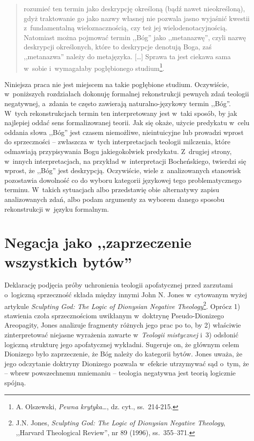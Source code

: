 \begin{quote}
rozumieć ten termin jako deskrypcję określoną (bądź nawet nieokreśloną), gdyż traktowanie go jako nazwy własnej nie pozwala jasno wyjaśnić kwestii z~fundamentalną wieloznacznością, czy też jej wielodenotacyjnością. Natomiast można pojmować termin ,,Bóg'' jako ,,metanazwę'', czyli nazwę deskrypcji określonych, które to deskrypcje denotują Boga, zaś ,,metanazwa'' należy do metajęzyka. [\ldots] Sprawa ta jest ciekawa sama w~sobie i~wymagałaby pogłębionego studium\footnote{A. Olszewski, \textit{Pewna krytyka}\ldots, dz. cyt., ss.~214-215.}.
\end{quote}

Niniejsza praca nie jest miejscem na takie pogłębione studium. Oczywiście, w~poniższych rozdziałach dokonuję formalnej rekonstrukcji pewnych zdań teologii negatywnej, a~zdania te często zawierają naturalno-językowy termin ,,Bóg''. W~tych rekonstrukcjach termin ten interpretowany jest w~taki sposób, by jak najlepiej oddać sens formalizowanej teorii. Jak się okaże, użycie predykatu w~celu oddania słowa ,,Bóg'' jest czasem niemożliwe, nieintuicyjne lub prowadzi wprost do sprzeczności – zwłaszcza w~tych interpretacjach teologii milczenia, które odmawiają przypisywania Bogu jakiegokolwiek predykatu. Z~drugiej strony, w~innych interpretacjach, na przykład w~interpretacji Bocheńskiego, twierdzi się wprost, że ,,Bóg'' jest deskrypcją. Oczywiście, wiele z~analizowanych stanowisk pozostawia dowolność co do wyboru kategorii językowej tego problematycznego terminu. W~takich sytuacjach albo przedstawię obie alternatywy zapisu analizowanych zdań, albo podam argumenty za wyborem danego sposobu rekonstrukcji w~języku formalnym.


\chapter{Negacja jako ,,zaprzeczenie wszystkich bytów''}\label{sil-jones}

Deklarację podjęcia próby uchronienia teologii apofatycznej przed zarzutami o~logiczną sprzeczność składa między innymi John N. Jones w~cytowanym wyżej artykule \textit{Sculpting God: The Logic of Dionysian Negative Theology}\footnote{J.N. Jones, \textit{Sculpting God: The Logic of Dionysian Negative Theology}, ,,Harvard Theological Review'', nr 89 (1996), ss.~355–371.}. Oprócz 1) stawienia czoła sprzecznościom uwikłanym w~doktrynę Pseudo-Dionizego Areopagity, Jones analizuje fragmenty różnych jego prac po to, by 2) właściwie zinterpretować niejasne wyrażenia zawarte w~\textit{Teologii mistycznej} i~3) odsłonić logiczną strukturę jego apofatycznej wykładni. Sugeruje on, że głównym celem Dionizego było zaprzeczenie, że Bóg należy do kategorii bytów. Jones uważa, że jego odczytanie doktryny Dionizego pozwala w~efekcie utrzymywać sąd o~tym, że -- wbrew powszechnemu mniemaniu -- teologia negatywna jest teorią logicznie spójną.

